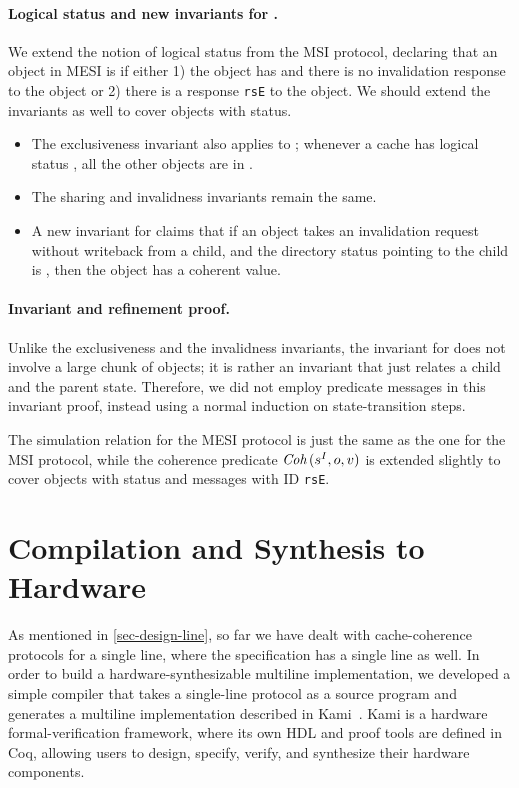 \documentclass[sigplan,10pt,review,anonymous,screen]{acmart}\settopmatter{printfolios=true,printccs=false,printacmref=false}
\def\slstinline{\lstinline[basicstyle=\ttfamily\small]}
\begin{document}
\paragraph{Logical status and new invariants for \stE{}.}
We extend the notion of logical status from the MSI protocol, declaring that an object in MESI is \stE{} if either 1) the object has \stE{} and there is no invalidation response to the object or 2) there is a response \slstinline{rsE} to the object.
We should extend the invariants as well to cover objects with \stE{} status.
\begin{itemize}
\item The exclusiveness invariant also applies to \stE{}; whenever a cache has logical status \stE{}, all the other objects are in \stI{}.
\item The sharing and invalidness invariants remain the same.
\item A new invariant for \stE{} claims that if an object takes an invalidation request without writeback from a child, and the directory status pointing to the child is \stE{}, then the object has a coherent value.
\end{itemize}

\paragraph{Invariant and refinement proof.}
Unlike the exclusiveness and the invalidness invariants, the invariant for \stE{} does not involve a large chunk of objects; it is rather an invariant that just relates a child and the parent state.
Therefore, we did not employ predicate messages in this invariant proof, instead using a normal induction on state-transition steps.

The simulation relation for the MESI protocol is just the same as the one for the MSI protocol, while the coherence predicate $\textit{Coh}\,(s^I, o, v)$ is extended slightly to cover objects with \stE{} status and messages with ID \slstinline{rsE}.

\section{Compilation and Synthesis to Hardware}
\label{sec-synthesis}

As mentioned in \autoref{sec-design-line}, so far we have dealt with cache-coherence protocols for a single line, where the specification has a single line as well.
In order to build a hardware-synthesizable multiline implementation, we developed a simple compiler that takes a single-line \hemiola{} protocol as a source program and generates a multiline implementation described in Kami~\cite{kami}.
Kami is a hardware formal-verification framework, where its own HDL and proof tools are defined in Coq, allowing users to design, specify, verify, and synthesize their hardware components.
\end{document}
